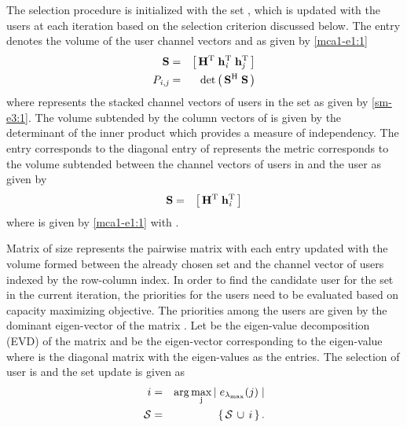 The selection procedure is initialized with the set , which is updated with the users at each iteration based on the selection criterion discussed below. The entry  denotes the volume of the user channel vectors  and  as given by \eqref{mca1-e1:1}
\begin{eqnarray}
\mbf{S} &=& \matscont{\mbf{H}^\mrm{T} \; \mvecxy{h}{i}^\mrm{T} \; \mvecxy{h}{j}^\mrm{T}} \\
\msclxyz{P}{i}{j} &=& \det{\left ( \, \mbf{S}^{\mrm{H}} \; \mbf{S} \, \right )} \label{mca1-e1:1}
\label{mca1-e1}
\end{eqnarray}
where  represents the stacked channel vectors of users in the set  as given by \eqref{sm-e3:1}. The volume subtended by the column vectors of  is given by the determinant of the inner product  which provides a measure of independency. The entry  corresponds to the diagonal entry of  represents the metric corresponds to the volume subtended between the channel vectors of users in  and the  user as given by
\begin{eqnarray}
\mbf{S} &=& \matscont{\mbf{H}^\mrm{T} \; \mvecxy{h}{i}^\mrm{T}}
\label{mca1-e2}
\end{eqnarray}
where  is given by \eqref{mca1-e1:1} with .

Matrix  of size  represents the pairwise matrix with each entry updated with the volume formed between the already chosen set  and the channel vector of users indexed by the row-column index. In order to find the candidate user for the set  in the current iteration, the priorities for the users need to be evaluated based on capacity maximizing objective. The priorities among the users are given by the dominant eigen-vector of the matrix  \cite{saaty2008decision}. Let  be the eigen-value decomposition (EVD) of the matrix  and  be the eigen-vector corresponding to the eigen-value  where \me{\mbf{\Lambda}} is the diagonal matrix with the eigen-values as the entries. The selection of user  is and the set update is given as
\begin{eqnarray}
i &=& \arg \max_{\mathrm{j}} |\;\msclxy{e}{\lambda_{\max}}(j)\;| \label{mca1-e3:1} \\
\mc{S} &=& \left \lbrace \, \mc{S} \, \cup \, i \, \right \rbrace.
\label{mca1-e3}
\end{eqnarray}


